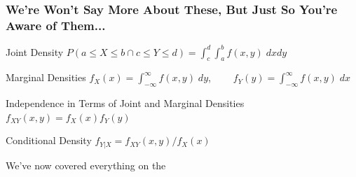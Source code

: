 \documentclass[handout]{beamer}
\begin{document}
\begin{frame}
\frametitle{We're Won't Say More About These, But Just So You're Aware of Them...}

\begin{block}{Joint Density}
$ \displaystyle P(a\leq X \leq b \cap c\leq Y \leq d) = \int_c^d \int_a^b f(x,y) \; dxdy$
\end{block}
\begin{block}{Marginal Densities}
$f_X(x) = \int_{-\infty}^\infty f(x,y)\; dy$, $\;\;\;\;\;\;\; f_Y(y) = \int_{-\infty}^\infty f(x,y)\; dx$
\end{block}
\begin{block}{Independence in Terms of Joint and Marginal Densities}
$f_{XY}(x,y) = f_X(x)f_Y(y)$
\end{block}
\begin{block}{Conditional Density}
$f_{Y|X} = f_{XY}(x,y)/f_X(x)$
\end{block}

\end{frame}

\begin{frame}

\huge We've now covered everything on the \href{http://fditraglia.github.io/Econ103Public/RandomVariablesHandout.pdf}{\textcolor{blue}{}}

\end{frame}
\end{document}
